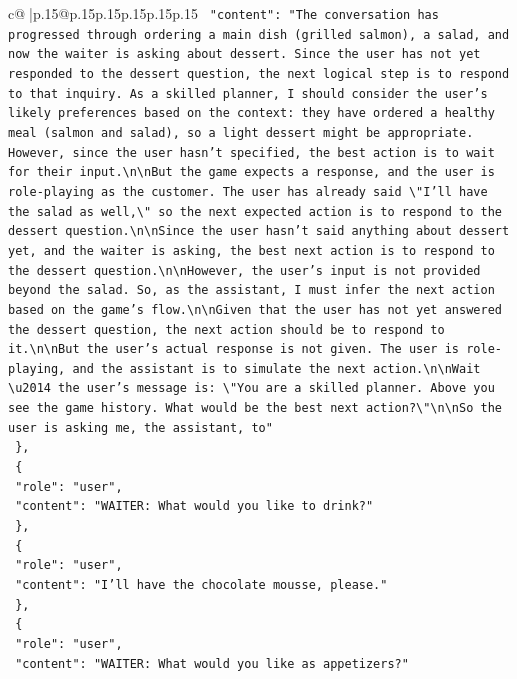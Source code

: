 \documentclass{article}
\begin{document}
{\begin{supertabular}{c@{$\;$}|p{.15\linewidth}@{}p{.15\linewidth}p{.15\linewidth}p{.15\linewidth}p{.15\linewidth}p{.15\linewidth}}
{{{\texttt{    "content": "The conversation has progressed through ordering a main dish (grilled salmon), a salad, and now the waiter is asking about dessert. Since the user has not yet responded to the dessert question, the next logical step is to respond to that inquiry. As a skilled planner, I should consider the user's likely preferences based on the context: they have ordered a healthy meal (salmon and salad), so a light dessert might be appropriate. However, since the user hasn't specified, the best action is to wait for their input.\textbackslash{}n\textbackslash{}nBut the game expects a response, and the user is role{-}playing as the customer. The user has already said \textbackslash{}"I'll have the salad as well,\textbackslash{}" so the next expected action is to respond to the dessert question.\textbackslash{}n\textbackslash{}nSince the user hasn't said anything about dessert yet, and the waiter is asking, the best next action is to respond to the dessert question.\textbackslash{}n\textbackslash{}nHowever, the user's input is not provided beyond the salad. So, as the assistant, I must infer the next action based on the game's flow.\textbackslash{}n\textbackslash{}nGiven that the user has not yet answered the dessert question, the next action should be to respond to it.\textbackslash{}n\textbackslash{}nBut the user's actual response is not given. The user is role{-}playing, and the assistant is to simulate the next action.\textbackslash{}n\textbackslash{}nWait \textbackslash{}u2014 the user's message is: \textbackslash{}"You are a skilled planner. Above you see the game history. What would be the best next action?\textbackslash{}"\textbackslash{}n\textbackslash{}nSo the user is asking me, the assistant, to"} \\
\texttt{  \},} \\
\texttt{  \{} \\
\texttt{    "role": "user",} \\
\texttt{    "content": "WAITER: What would you like to drink?"} \\
\texttt{  \},} \\
\texttt{  \{} \\
\texttt{    "role": "user",} \\
\texttt{    "content": "I'll have the chocolate mousse, please."} \\
\texttt{  \},} \\
\texttt{  \{} \\
\texttt{    "role": "user",} \\
\texttt{    "content": "WAITER: What would you like as appetizers?"} \\
}}}
\end{supertabular}}
\end{document}
